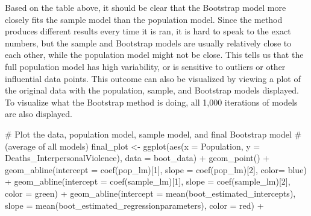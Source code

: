 \documentclass[
  letterpaper,
  DIV=11,
  numbers=noendperiod]{scrartcl}
\newenvironment{Shaded}{\begin{snugshade}}{\end{snugshade}}
\newcommand{\AttributeTok}[1]{\textcolor[rgb]{0.40,0.45,0.13}{#1}}
\newcommand{\CommentTok}[1]{\textcolor[rgb]{0.37,0.37,0.37}{#1}}
\newcommand{\DecValTok}[1]{\textcolor[rgb]{0.68,0.00,0.00}{#1}}
\newcommand{\FunctionTok}[1]{\textcolor[rgb]{0.28,0.35,0.67}{#1}}
\newcommand{\NormalTok}[1]{\textcolor[rgb]{0.00,0.23,0.31}{#1}}
\newcommand{\OtherTok}[1]{\textcolor[rgb]{0.00,0.23,0.31}{#1}}
\newcommand{\SpecialCharTok}[1]{\textcolor[rgb]{0.37,0.37,0.37}{#1}}
\newcommand{\StringTok}[1]{\textcolor[rgb]{0.13,0.47,0.30}{#1}}
\begin{document}
Based on the table above, it should be clear that the Bootstrap model
more closely fits the sample model than the population model. Since the
method produces different results every time it is ran, it is hard to
speak to the exact numbers, but the sample and Bootstrap models are
usually relatively close to each other, while the population model might
not be close. This tells us that the full population model has high
variability, or is sensitive to outliers or other influential data
points. This outcome can also be visualized by viewing a plot of the
original data with the population, sample, and Bootstrap models
displayed. To visualize what the Bootstrap method is doing, all 1,000
iterations of models are also displayed.

\begin{Shaded}
\begin{Highlighting}[]
\CommentTok{\# Plot the data, population model, sample model, and final Bootstrap model }
\CommentTok{\# (average of all models)}
\NormalTok{final\_plot }\OtherTok{\textless{}{-}} \FunctionTok{ggplot}\NormalTok{(}\FunctionTok{aes}\NormalTok{(}\AttributeTok{x =}\NormalTok{ Population, }\AttributeTok{y =}\NormalTok{ Deaths\_InterpersonalViolence), }
                     \AttributeTok{data =}\NormalTok{ boot\_data) }\SpecialCharTok{+}
              \FunctionTok{geom\_point}\NormalTok{() }\SpecialCharTok{+}
              \FunctionTok{geom\_abline}\NormalTok{(}\AttributeTok{intercept =} \FunctionTok{coef}\NormalTok{(pop\_lm)[}\DecValTok{1}\NormalTok{], }
                          \AttributeTok{slope =} \FunctionTok{coef}\NormalTok{(pop\_lm)[}\DecValTok{2}\NormalTok{], }
                          \AttributeTok{color=} \StringTok{\textquotesingle{}blue\textquotesingle{}}\NormalTok{) }\SpecialCharTok{+}
              \FunctionTok{geom\_abline}\NormalTok{(}\AttributeTok{intercept =} \FunctionTok{coef}\NormalTok{(sample\_lm)[}\DecValTok{1}\NormalTok{], }
                          \AttributeTok{slope =} \FunctionTok{coef}\NormalTok{(sample\_lm)[}\DecValTok{2}\NormalTok{], }
                          \AttributeTok{color =} \StringTok{\textquotesingle{}green\textquotesingle{}}\NormalTok{) }\SpecialCharTok{+}
              \FunctionTok{geom\_abline}\NormalTok{(}\AttributeTok{intercept =} \FunctionTok{mean}\NormalTok{(boot\_estimated\_intercepts), }
                          \AttributeTok{slope =} \FunctionTok{mean}\NormalTok{(boot\_estimated\_regressionparameters), }
                          \AttributeTok{color =} \StringTok{\textquotesingle{}red\textquotesingle{}}\NormalTok{) }\SpecialCharTok{+}

\end{Highlighting}
\end{Shaded}
\end{document}
